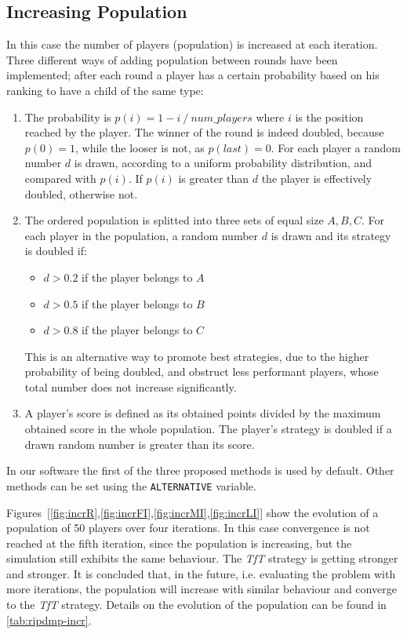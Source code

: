 \documentclass[journal,a4paper,10pt,twoside]{IEEEtran} %
\begin{document}
\subsection{Increasing Population}
In this case the number of players (population) is increased at each iteration. Three different ways of adding population between rounds have been implemented; after each round a player has a certain probability based on his ranking to have a child of the same type:
\begin{enumerate}
    \item The probability is $p(i)=1- i\ /\ num\_players$ where $i$ is the position reached by the player. The winner of the round is indeed doubled, because $p(0)=1$, while the looser is not, as $p(last)=0$.
    For each player a random number $d$ is drawn, according to a uniform probability distribution, and compared with $p(i)$. If $p(i)$ is greater than $d$ the player is effectively doubled, otherwise not.
    \item The ordered population is splitted into three sets of equal size $A,B,C$. For each player in the population, a random number $d$ is drawn and its strategy is doubled if:
    \begin{itemize}
        \item $d>0.2$ if the player belongs to $A$
        \item $d>0.5$ if the player belongs to $B$
        \item $d>0.8$ if the player belongs to $C$
    \end{itemize}
    This is an alternative way to promote best strategies, due to the higher probability of being doubled, and obstruct less performant players, whose total number does not increase significantly.
    \item A player's score is defined as its obtained points divided by the maximum obtained score in the whole population. The player's strategy is doubled if a drawn random number is greater than its score.
\end{enumerate}

In our software the first of the three proposed methods is used by default. Other methods can be set using the \texttt{ALTERNATIVE} variable.

Figures~[\ref{fig:incrR},\ref{fig:incrFI},\ref{fig:incrMI},\ref{fig:incrLI}] show the evolution of a population of 50 players over four iterations. In this case convergence is not reached at the fifth iteration, since the population is increasing, but the simulation still exhibits the same behaviour. The \textit{TfT} strategy is getting stronger and stronger. It is concluded that, in the future, i.e. evaluating the problem with more iterations, the population will increase with similar behaviour and converge to the \textit{TfT} strategy. Details on the evolution of the population can be found in \autoref{tab:ripdmp-incr}.
\end{document}

